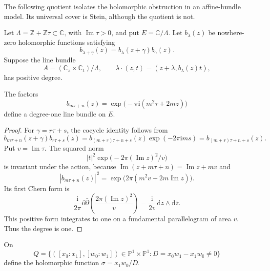 The following quotient isolates the holomorphic obstruction in an affine-bundle model. Its universal cover is Stein, although the quotient is not.

Let $\Lambda=\mathbb Z+\mathbb Z\tau\subset\mathbb C$, with $\operatorname{Im}\tau>0$, and put $E=\mathbb C/\Lambda$. Let $b_\lambda(z)$ be nowhere-zero holomorphic functions satisfying
\[
 b_{\lambda+\gamma}(z)=b_\lambda(z+\gamma)b_\gamma(z).
\]
Suppose the line bundle
\[
 A=(\mathbb C_z\times\mathbb C_t)/\Lambda,
 \qquad\lambda\cdot(z,t)=(z+\lambda,b_\lambda(z)t),
\]
has positive degree.

\begin{example}\label{ex:positive-elliptic-automorphy}
The factors
\[
 b_{m\tau+n}(z)=\exp\bigl(-\pi\mathrm{i}(m^2\tau+2mz)\bigr)
\]
define a degree-one line bundle on $E$.
\end{example}
\begin{proof}
For $\gamma=r\tau+s$, the cocycle identity follows from
\[
 b_{m\tau+n}(z+\gamma)b_{r\tau+s}(z)
       =b_{(m+r)\tau+n+s}(z)\exp(-2\pi\mathrm{i}ms)
       =b_{(m+r)\tau+n+s}(z).
\]
Put $v=\operatorname{Im}\tau$. The squared norm
\[
 |t|^2\exp\bigl(-2\pi(\operatorname{Im}z)^2/v\bigr)
\]
is invariant under the action, because $\operatorname{Im}(z+m\tau+n)=\operatorname{Im}z+mv$ and
\[
 |b_{m\tau+n}(z)|^2=\exp\bigl(2\pi(m^2v+2m\operatorname{Im}z)\bigr).
\]
Its first Chern form is
\[
 \frac{\mathrm{i}}{2\pi}\partial\bar\partial
              \left(\frac{2\pi(\operatorname{Im}z)^2}{v}\right)
       =\frac{\mathrm{i}}{2v}\,\mathrm{d}z\wedge\mathrm{d}\bar z.
\]
This positive form integrates to one on a fundamental parallelogram of area $v$. Thus the degree is one.
\end{proof}

On
\[
 Q=\{([x_0:x_1],[w_0:w_1])\in\mathbb P^1\times\mathbb P^1:
                    D=x_0w_1-x_1w_0\ne0\}
\]
define the holomorphic function $\sigma=x_1w_0/D$.

